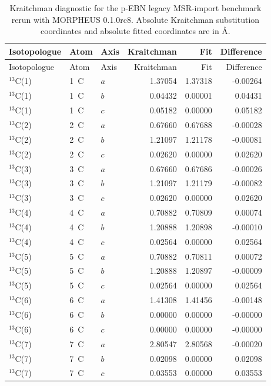 \begin{longtable}{lllrrr}
\caption{Kraitchman diagnostic for the p-EBN legacy MSR-import benchmark rerun with MORPHEUS 0.1.0rc8. Absolute Kraitchman substitution coordinates and absolute fitted coordinates are in \AA.}\label{tab:si-p-ebn-kraitchman}\\
\toprule
Isotopologue & Atom & Axis & Kraitchman & Fit & Difference \\
\midrule
\endfirsthead
\toprule
Isotopologue & Atom & Axis & Kraitchman & Fit & Difference \\
\midrule
\endhead
$^{13}$C(1) & 1~C & $a$ & 1.37054 & 1.37318 & -0.00264 \\
$^{13}$C(1) & 1~C & $b$ & 0.04432 & 0.00001 & 0.04431 \\
$^{13}$C(1) & 1~C & $c$ & 0.05182 & 0.00000 & 0.05182 \\
$^{13}$C(2) & 2~C & $a$ & 0.67660 & 0.67688 & -0.00028 \\
$^{13}$C(2) & 2~C & $b$ & 1.21097 & 1.21178 & -0.00081 \\
$^{13}$C(2) & 2~C & $c$ & 0.02620 & 0.00000 & 0.02620 \\
$^{13}$C(3) & 3~C & $a$ & 0.67660 & 0.67686 & -0.00026 \\
$^{13}$C(3) & 3~C & $b$ & 1.21097 & 1.21179 & -0.00082 \\
$^{13}$C(3) & 3~C & $c$ & 0.02620 & 0.00000 & 0.02620 \\
$^{13}$C(4) & 4~C & $a$ & 0.70882 & 0.70809 & 0.00074 \\
$^{13}$C(4) & 4~C & $b$ & 1.20888 & 1.20898 & -0.00010 \\
$^{13}$C(4) & 4~C & $c$ & 0.02564 & 0.00000 & 0.02564 \\
$^{13}$C(5) & 5~C & $a$ & 0.70882 & 0.70811 & 0.00072 \\
$^{13}$C(5) & 5~C & $b$ & 1.20888 & 1.20897 & -0.00009 \\
$^{13}$C(5) & 5~C & $c$ & 0.02564 & 0.00000 & 0.02564 \\
$^{13}$C(6) & 6~C & $a$ & 1.41308 & 1.41456 & -0.00148 \\
$^{13}$C(6) & 6~C & $b$ & 0.00000 & 0.00000 & -0.00000 \\
$^{13}$C(6) & 6~C & $c$ & 0.00000 & 0.00000 & -0.00000 \\
$^{13}$C(7) & 7~C & $a$ & 2.80547 & 2.80568 & -0.00020 \\
$^{13}$C(7) & 7~C & $b$ & 0.02098 & 0.00000 & 0.02098 \\
$^{13}$C(7) & 7~C & $c$ & 0.03553 & 0.00000 & 0.03553 \\

\end{longtable}
